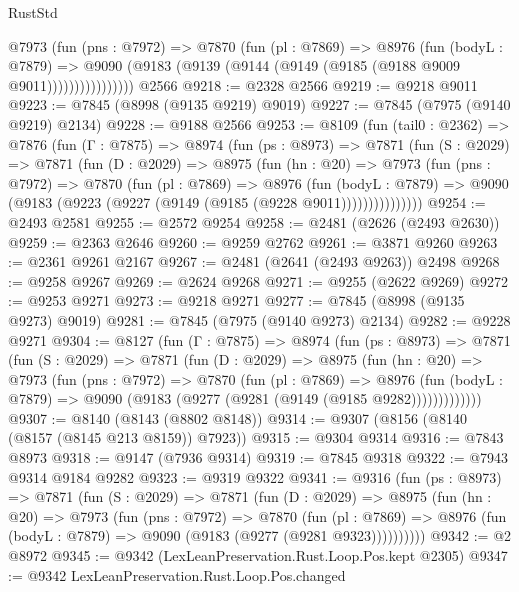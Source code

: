 \begin{lexlean}{RustStd}
\begin{coremodule}
                @7973
                  (fun (pns : @7972) =>
                  @7870
                    (fun (pl : @7869) =>
                    @8976
                      (fun (bodyL : @7879) =>
                      @9090 (@9183 (@9139 (@9144 (@9149 (@9185 (@9188 @9009 @9011))))))))))))))))
    @2566
@9218 := @2328 @2566
@9219 := @9218 @9011
@9223 := @7845 (@8998 (@9135 @9219) @9019)
@9227 := @7845 (@7975 (@9140 @9219) @2134)
@9228 := @9188 @2566
@9253 := @8109
    (fun (tail0 : @2362) =>
    @7876
      (fun (Γ : @7875) =>
      @8974
        (fun (ps : @8973) =>
        @7871
          (fun (S : @2029) =>
          @7871
            (fun (D : @2029) =>
            @8975
              (fun (hn : @20) =>
              @7973
                (fun (pns : @7972) =>
                @7870
                  (fun (pl : @7869) =>
                  @8976
                    (fun (bodyL : @7879) =>
                    @9090 (@9183 (@9223 (@9227 (@9149 (@9185 (@9228 @9011)))))))))))))))
@9254 := @2493 @2581
@9255 := @2572 @9254
@9258 := @2481 (@2626 (@2493 @2630))
@9259 := @2363 @2646
@9260 := @9259 @2762
@9261 := @3871 @9260
@9263 := @2361 @9261 @2167
@9267 := @2481 (@2641 (@2493 @9263)) @2498
@9268 := @9258 @9267
@9269 := @2624 @9268
@9271 := @9255 (@2622 @9269)
@9272 := @9253 @9271
@9273 := @9218 @9271
@9277 := @7845 (@8998 (@9135 @9273) @9019)
@9281 := @7845 (@7975 (@9140 @9273) @2134)
@9282 := @9228 @9271
@9304 := @8127
    (fun (Γ : @7875) =>
    @8974
      (fun (ps : @8973) =>
      @7871
        (fun (S : @2029) =>
        @7871
          (fun (D : @2029) =>
          @8975
            (fun (hn : @20) =>
            @7973
              (fun (pns : @7972) =>
              @7870
                (fun (pl : @7869) =>
                @8976
                  (fun (bodyL : @7879) =>
                  @9090 (@9183 (@9277 (@9281 (@9149 (@9185 @9282)))))))))))))
@9307 := @8140 (@8143 (@8802 @8148))
@9314 := @9307 (@8156 (@8140 (@8157 (@8145 @213 @8159)) @7923))
@9315 := @9304 @9314
@9316 := @7843 @8973
@9318 := @9147 (@7936 @9314)
@9319 := @7845 @9318
@9322 := @7943 @9314 @9184 @9282
@9323 := @9319 @9322
@9341 := @9316
    (fun (ps : @8973) =>
    @7871
      (fun (S : @2029) =>
      @7871
        (fun (D : @2029) =>
        @8975
          (fun (hn : @20) =>
          @7973
            (fun (pns : @7972) =>
            @7870
              (fun (pl : @7869) =>
              @8976 (fun (bodyL : @7879) => @9090 (@9183 (@9277 (@9281 @9323))))))))))
@9342 := @2 @8972
@9345 := @9342 (LexLeanPreservation.Rust.Loop.Pos.kept @2305)
@9347 := @9342 LexLeanPreservation.Rust.Loop.Pos.changed

\end{coremodule}
\end{lexlean}
